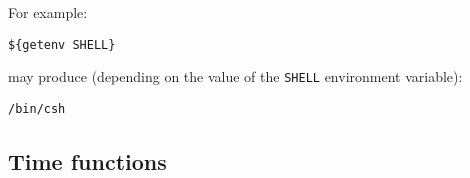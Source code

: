 \par
For example:
\begin{showfile}
\begin{verbatim}
${getenv SHELL}
\end{verbatim}
\end{showfile}
may produce (depending on the value of the \verb+SHELL+ environment variable):
\begin{showfile}
\begin{verbatim}
/bin/csh
\end{verbatim}
\end{showfile}
\subsection{Time functions}
\nopagebreak
\par
